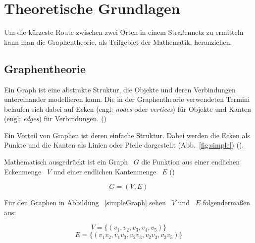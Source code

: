 \section{Theoretische Grundlagen}

Um die kürzeste Route zwischen zwei Orten in einem Straßennetz zu ermitteln kann man die
Graphentheorie, als Teilgebiet der Mathematik, heranziehen.

\subsection{Graphentheorie}

Ein Graph ist eine abstrakte Struktur, die Objekte und deren Verbindungen untereinander modellieren kann.
Die in der Graphentheorie verwendeten Termini belaufen sich dabei auf Ecken (engl: \textit{nodes} oder \textit{vertices}) für Objekte und Kanten (engl: \textit{edges}) für Verbindungen.
(\cite[49]{kurt})

Ein Vorteil von Graphen ist deren einfache Struktur.
Dabei werden die Ecken als Punkte und die Kanten als Linien oder Pfeile dargestellt (Abb.~\ref{fig:simple}) (\cite[49]{kurt}).

Mathematisch ausgedrückt ist ein Graph ~$G$ die Funktion aus einer endlichen Eckenmenge ~$V$ und einer endlichen Kantenmenge ~$E$ (\cite[4]{theory})

	$$G = (V,E)$$

Für den Graphen in Abbildung ~\ref{simpleGraph} sehen ~$V$ und ~$E$ folgendermaßen aus:

$$V = \{(v_{1},v_{2},v_{3},v_{4},v_{5})\} $$
$$E = \{(v_{1}v_{2},v_{1}v_{3},v_{2}v_{3},v_{2}v_{3},v_{3}v_{5})\} $$

